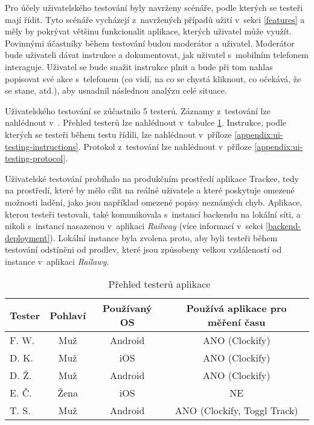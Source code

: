 Pro účely uživatelského testování byly navrženy scénáře, podle kterých se testeři mají řídit. Tyto scénáře vycházejí z~navržených případů užití v~sekci \ref{features} a měly by pokrývat většinu funkcionalit aplikace, kterých uživatel může využít. Povinnými účastníky během testování budou moderátor a uživatel. Moderátor bude uživateli dávat instrukce a dokumentovat, jak uživatel s~mobilním telefonem interaguje. Uživatel se bude snažit instrukce plnit a bude při tom nahlas popisovat své akce s~telefonem (co vidí, na co se chystá kliknout, co očekává, že se stane, atd.), aby usnadnil následnou analýzu celé situace. 

Uživatelského testování se zúčastnilo 5 testerů. Záznamy z~testování lze nahlédnout v~\cite{ui-testing-playlist}. Přehled testerů lze nahlédnout v~tabulce \ref{table:testers}. Instrukce, podle kterých se testeři během testu řídili, lze nahlédnout v~příloze \ref{appendix:ui-testing-instructions}. Protokol z~testování lze nahlédnout v~příloze \ref{appendix:ui-testing-protocol}.

Uživatelské testování probíhalo na produkčním prostředí aplikace Trackee, tedy na prostředí, které by mělo cílit na reálné uživatele a které poskytuje omezené možnosti ladění, jako jsou například omezené popisy neznámých chyb. Aplikace, kterou testeři testovali, také komunikovala s~instancí backendu na lokální síti, a nikoli s~instancí nasazenou v~aplikaci \emph{Railway} (více informací v~sekci \ref{backend-deployment}). Lokální instance byla zvolena proto, aby byli testeři během testování odstíněni od prodlev, které jsou způsobeny velkou vzdáleností od instance v~aplikaci \emph{Railawy}.

\begin{table}\centering
\begin{tabular}{l|c|c|c}
	Tester		& Pohlaví	& Používaný OS	& Používá aplikace pro měření času	\tabularnewline \hline 
 	F. W.		& Muž		& Android       & ANO (Clockify)	                \tabularnewline \hline
	D. K.		& Muž		& iOS	        & ANO (Clockify)                	\tabularnewline \hline
	D. Ž.		& Muž		& Android       & ANO (Clockify)               		\tabularnewline \hline
	E. Č.		& Žena		& iOS	        & NE 	                	        \tabularnewline \hline
	T. S.		& Muž		& Android       & ANO (Clockify, Toggl Track)	    \tabularnewline \hline
\end{tabular}
\vspace{0.5cm}
\caption[Přehled testerů aplikace]{~Přehled testerů aplikace}\label{table:testers}
\end{table} 

